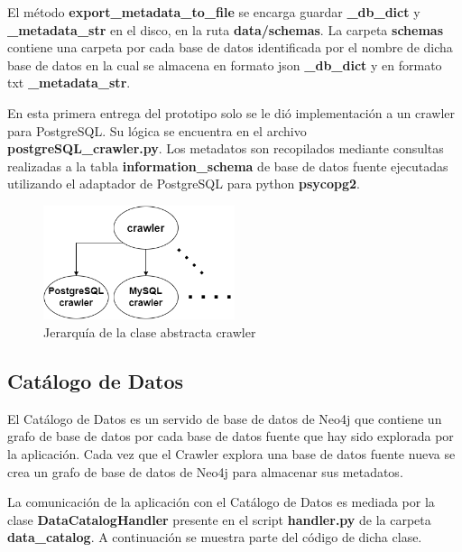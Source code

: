 El m\'etodo \textbf{export\_metadata\_to\_file} se encarga guardar \textbf{\_db\_dict} y \textbf{\_metadata\_str} en el disco, 
en la ruta \textbf{data/schemas}. La carpeta \textbf{schemas} contiene una carpeta por cada base de datos identificada 
por el nombre de dicha base de datos en la cual se almacena en formato json \textbf{\_db\_dict} y en formato txt 
\textbf{\_metadata\_str}.

En esta primera entrega del prototipo solo se le di\'o implementaci\'on a un crawler para PostgreSQL. Su l\'ogica 
se encuentra en el archivo \textbf{postgreSQL\_crawler.py}. Los metadatos son recopilados mediante consultas realizadas
a la tabla \textbf{information\_schema} de base de datos fuente ejecutadas 
utilizando el adaptador de PostgreSQL para python \textbf{psycopg2}.

\begin{figure}[htb]
    \centering
    \includegraphics[width=0.5\textwidth]{Graphics/crawler_class.drawio.png}
    \caption{Jerarqu\'ia de la clase abstracta crawler}
    \label{fig:crawler}
\end{figure}


\subsection{Cat\'alogo de Datos}

El Cat\'alogo de Datos es un servido de base de datos de Neo4j que contiene un grafo de base de datos por cada base de datos 
fuente que hay sido explorada por la aplicaci\'on. Cada vez que el Crawler explora una base de datos fuente nueva se crea 
un grafo de base de datos de Neo4j para almacenar sus metadatos.

La comunicaci\'on de la aplicaci\'on con el Cat\'alogo de Datos es mediada por la clase \textbf{DataCatalogHandler} 
presente en el script \textbf{handler.py} de la carpeta \textbf{data\_catalog}. A continuación se muestra parte 
del c\'odigo de dicha clase.

